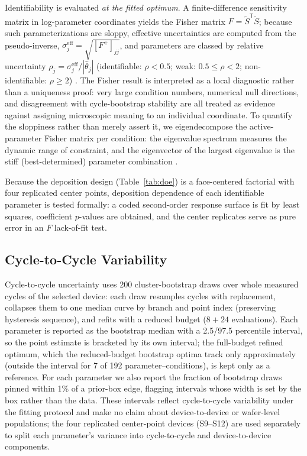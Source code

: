 \documentclass[journal]{IEEEtran}
\begin{document}
Identifiability is evaluated \emph{at the fitted optimum}.  A
finite-difference sensitivity matrix in log-parameter coordinates yields the
Fisher matrix $F=\widetilde S^{\mathsf T}\widetilde S$; because such
parameterizations are sloppy, effective uncertainties are computed from the
pseudo-inverse, $\sigma_j^{\mathrm{eff}}=\sqrt{[F^+]_{jj}}$, and parameters
are classed by relative uncertainty
$\rho_j=\sigma_j^{\mathrm{eff}}/|\hat\theta_j|$ (identifiable: $\rho<0.5$;
weak: $0.5\le\rho<2$; non-identifiable: $\rho\ge2$)
\cite{raue2009,transtrum2015sloppiness}.  The Fisher result is interpreted as
a local diagnostic rather than a uniqueness proof: very large condition
numbers, numerical null directions, and disagreement with cycle-bootstrap
stability are all treated as evidence against assigning microscopic meaning
to an individual coordinate.  To quantify the sloppiness rather than merely
assert it, we eigendecompose the active-parameter Fisher matrix per condition:
the eigenvalue spectrum measures the dynamic range of constraint, and the
eigenvector of the largest eigenvalue is the stiff (best-determined) parameter
combination \cite{transtrum2015sloppiness}.

Because the deposition design (Table~\ref{tab:doe}) is a face-centered
factorial with four replicated center points, deposition dependence of each
identifiable parameter is tested formally: a coded second-order response
surface is fit by least squares, coefficient $p$-values are obtained, and the
center replicates serve as pure error in an $F$ lack-of-fit test.

\subsection{Cycle-to-Cycle Variability}
\label{sec:boot}

Cycle-to-cycle uncertainty uses 200 cluster-bootstrap draws over whole measured
cycles of the selected device: each draw resamples cycles with replacement,
collapses them to one median curve by branch and point index (preserving
hysteresis sequence), and refits with a reduced budget ($8+24$ evaluations).
Each parameter is reported as the bootstrap median with a 2.5/97.5 percentile
interval, so the point estimate is bracketed by its own interval; the
full-budget refined optimum, which the reduced-budget bootstrap optima track
only approximately (outside the interval for 7 of 192 parameter--conditions),
is kept only as a reference.  For each parameter we also report the fraction of
bootstrap draws pinned within 1\% of a prior-box edge, flagging intervals whose
width is set by the box rather than the data.  These intervals reflect
cycle-to-cycle variability under the fitting protocol and make no claim about
device-to-device or wafer-level populations; the four replicated center-point
devices (S9--S12) are used separately to split each parameter's variance into
cycle-to-cycle and device-to-device components.
\end{document}
